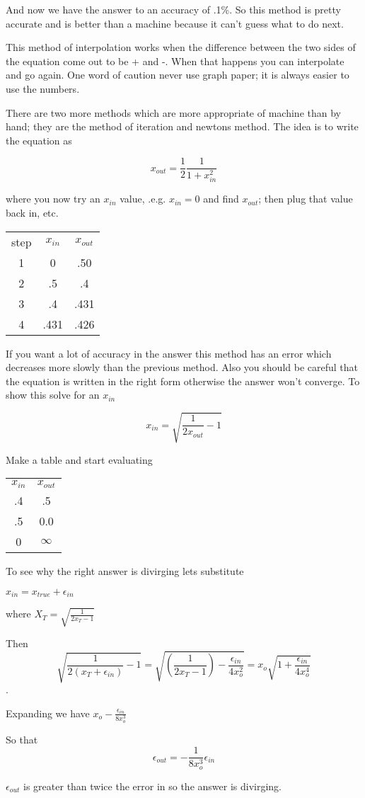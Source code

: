 \documentclass[a4paper,10pt]{article}
\begin{document}
And now we have the answer to an accuracy of .1\%. So this method is pretty accurate and is better than a machine because
it can't guess what to do next.

This method of interpolation works when the difference between the two sides of the equation come out to be + and -. 
When that happens you can interpolate and go again.  One word of caution never use graph paper; it is always easier to use the
numbers.

There are two more methods which are more appropriate of machine than by hand; they are the method of iteration and newtons method.
The idea is to write the equation as
\begin{center}
 $$x_{out}=\frac{1}{2}\frac{1}{1+x^2_{in}}$$
\end{center}

where you now try an $x_{in}$ value, .e.g. $x_{in}=0$ and find $x_{out}$; then plug that value back in, etc.

\begin{tabular}{c c c}
step & $x_{in}$ & $x_{out}$\\
1 & 0 & .50\\
2 & .5 & .4\\
3 & .4 & .431\\
4 & .431 & .426
\end{tabular}

If you want a lot of accuracy in the answer this method has an error which decreases more slowly than the previous method. 
Also you should be careful that the equation is written in the right form otherwise the answer won't converge. To show this solve
for an $x_{in}$ 
\begin{center}
 $$x_{in}=\sqrt{\frac{1}{2x_{out}}-1}$$
\end{center}

Make a table and start evaluating
\begin{center}
\begin{tabular}{c c}
$x_{in}$ & $x_{out}$\\
.4 & .5\\
.5 & 0.0\\
0 & $\infty$

\end{tabular}
\end{center}

To see why the right answer is divirging lets substitute \begin{center}$x_{in}=x_{true}+\epsilon_{in}$\end{center}
where $X_T=\sqrt{\frac{1}{2x_T-1}}$

Then $$\sqrt{\frac{1}{2(x_T+\epsilon_{in})}-1}=\sqrt{(\frac{1}{2x_T-1})-\frac{\epsilon_{in}}{4x_o^2}}=x_o\sqrt{1+\frac{\epsilon_{in}}{4x_o^4}}$$.

Expanding we have $x_o-\frac{\epsilon_{in}}{8x_o^3}$

So that $$\epsilon_{out}=-\frac{1}{8x_o^3}\epsilon_{in}$$

$\epsilon_{out}$ is greater than twice the error in so the answer is divirging. 
\end{document}
